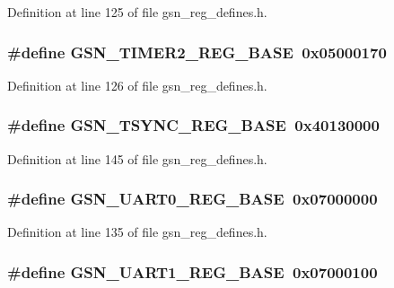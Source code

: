 Definition at line 125 of file gsn\_\-reg\_\-defines.h.

\hypertarget{a00546_a882acc1ea8af7716a2d89b8e0a315827}{
\subsubsection[{GSN\_\-TIMER2\_\-REG\_\-BASE}]{\setlength{\rightskip}{0pt plus 5cm}\#define GSN\_\-TIMER2\_\-REG\_\-BASE~0x05000170}}
\label{a00546_a882acc1ea8af7716a2d89b8e0a315827}


Definition at line 126 of file gsn\_\-reg\_\-defines.h.

\hypertarget{a00546_a8adfa68c5dd5e1733c1da51e8475009d}{
\subsubsection[{GSN\_\-TSYNC\_\-REG\_\-BASE}]{\setlength{\rightskip}{0pt plus 5cm}\#define GSN\_\-TSYNC\_\-REG\_\-BASE~0x40130000}}
\label{a00546_a8adfa68c5dd5e1733c1da51e8475009d}


Definition at line 145 of file gsn\_\-reg\_\-defines.h.

\hypertarget{a00546_ad2a4666b8d4948fa11e988fccf0d88f7}{
\subsubsection[{GSN\_\-UART0\_\-REG\_\-BASE}]{\setlength{\rightskip}{0pt plus 5cm}\#define GSN\_\-UART0\_\-REG\_\-BASE~0x07000000}}
\label{a00546_ad2a4666b8d4948fa11e988fccf0d88f7}


Definition at line 135 of file gsn\_\-reg\_\-defines.h.

\hypertarget{a00546_a561c2e1172058dd7aa531ae977dec5fd}{
\subsubsection[{GSN\_\-UART1\_\-REG\_\-BASE}]{\setlength{\rightskip}{0pt plus 5cm}\#define GSN\_\-UART1\_\-REG\_\-BASE~0x07000100}}
\label{a00546_a561c2e1172058dd7aa531ae977dec5fd}


